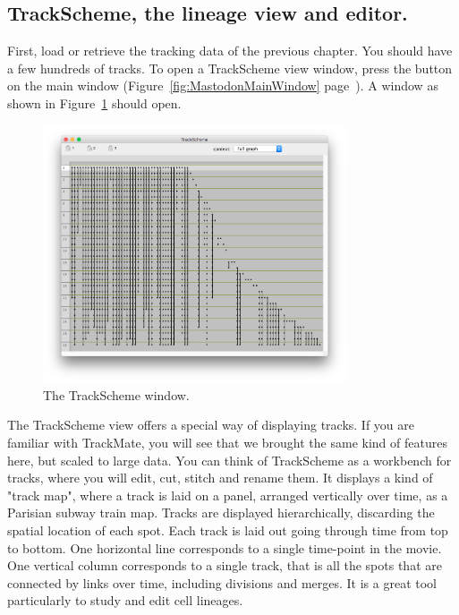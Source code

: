 \subsection{TrackScheme, the lineage view and editor.}

First, load or retrieve the tracking data of the previous chapter. 
You should have a few hundreds of tracks. 
To open a TrackScheme view window, press the  button on the main window (Figure~\ref{fig:MastodonMainWindow} page~\pageref{fig:MastodonMainWindow}).
A window as shown in Figure~\ref{fig:TrackScheme} should open.

\begin{figure}
    \centering
    \includegraphics[width=0.8\textwidth,trim=0.5cm .5cm .5cm .5cm,clip]{figures/Mastodon_TrackScheme.png}
     \caption{The TrackScheme window.}
     \label{fig:TrackScheme}
\end{figure}  

The TrackScheme view offers a special way of displaying tracks. 
If you are familiar with TrackMate, you will see that we brought the same kind of features here, but scaled to large data.
You can think of TrackScheme as a workbench for tracks, where you will edit, cut, stitch and rename them.
It displays a kind of "track map", where a track is laid on a panel, arranged vertically over time, as a Parisian subway train map. 
Tracks are displayed hierarchically, discarding the spatial location of each spot. 
Each track is laid out going through time from top to bottom.
One horizontal line corresponds to a single time-point in the movie.
One vertical column corresponds to a single track, that is all the spots that are connected by links over time, including divisions and merges.
It is a great tool particularly to study and edit cell lineages.

